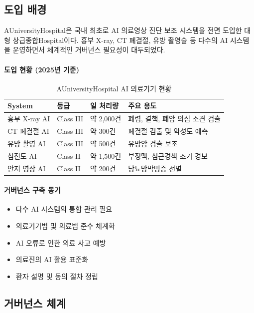 \subsection{도입 배경}
\label{sec:7.2.1}

AUniversityHospital은 국내 최초로 AI 의료영상 진단 보조\cite{rajpurkar2022ai} 시스템을 
전면 도입한 대형 상급종합Hospital이다. 
흉부 X-ray, CT 폐결절, 유방 촬영술 등 다수의 AI 시스템을 운영하면서 
체계적인 거버넌스 필요성이 대두되었다.

\paragraph{도입 현황 (2025년 기준)}

\begin{table}[htbp]
\centering
\caption{AUniversityHospital AI 의료기기 현황}
\label{tab:hospital_ai_inventory}
\begin{tabularx}{\textwidth}{p{3.5cm}p{2cm}p{2cm}X}
\toprule
\textbf{System} & \textbf{등급} & \textbf{일 처리량} & \textbf{주요 용도} \\
\midrule
흉부 X-ray AI & Class III & 약 2,000건 & 폐렴, 결핵, 폐암 의심 소견 검출 \\
CT 폐결절 AI & Class III & 약 300건 & 폐결절 검출 및 악성도 예측 \\
유방 촬영 AI & Class III & 약 500건 & 유방암 검출 보조 \\
심전도 AI & Class II & 약 1,500건 & 부정맥, 심근경색 조기 경보 \\
안저 영상 AI & Class II & 약 200건 & 당뇨망막병증 선별 \\
\bottomrule
\end{tabularx}
\end{table}


\paragraph{거버넌스 구축 동기}

\begin{itemize}
 \item 다수 AI 시스템의 통합 관리 필요
 \item 의료기기법 및 의료법 준수 체계화
 \item AI 오류로 인한 의료 사고 예방
 \item 의료진의 AI 활용 표준화
 \item 환자 설명 및 동의 절차 정립
\end{itemize}


\subsection{거버넌스 체계}
\label{sec:7.2.2}

